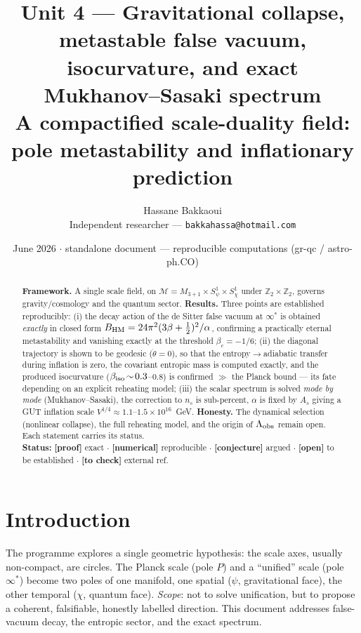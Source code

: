 \documentclass[11pt,a4paper]{article}
\title{\vspace{-1.2cm}\textbf{Unit 4 --- Gravitational collapse, metastable false vacuum,\\ isocurvature, and exact Mukhanov--Sasaki spectrum}\\[4pt]
\large A compactified scale-duality field: pole metastability and inflationary prediction}
\author{Hassane Bakkaoui\\ \small Independent researcher --- \texttt{bakkahassa@hotmail.com}}
\date{\small June 2026 $\cdot$ standalone document --- reproducible computations (gr-qc / astro-ph.CO)}
\newcommand{\st}[1]{\textbf{\textcolor{blue!45!black}{[#1]}}}
\newcommand{\fpole}{\infty^*}
\begin{document}
\maketitle
\thispagestyle{fancy}

\begin{abstract}
\noindent\textbf{Framework.} A single scale field, on $\mathcal{M}=M_{3+1}\times S^1_\psi\times S^1_\chi$ under $\mathbb{Z}_2\times\mathbb{Z}_2$, governs gravity/cosmology and the quantum sector. \textbf{Results.} Three points are established reproducibly: (i) the decay action of the de Sitter false vacuum at $\fpole$ is obtained \emph{exactly} in closed form $B_{\rm HM}=24\pi^2(3\beta+\tfrac12)^2/\alpha$, confirming a practically eternal metastability and vanishing exactly at the threshold $\beta_c=-1/6$; (ii) the diagonal trajectory is shown to be geodesic ($\dot\theta=0$), so that the entropy$\to$adiabatic transfer during inflation is zero, the covariant entropic mass is computed exactly, and the produced isocurvature ($\beta_{\rm iso}\!\sim\!0.3$--$0.8$) is confirmed $\gg$ the Planck bound --- its fate depending on an explicit reheating model; (iii) the scalar spectrum is solved \emph{mode by mode} (Mukhanov--Sasaki), the correction to $n_s$ is sub-percent, $\alpha$ is fixed by $A_s$ giving a GUT inflation scale $V^{1/4}\!\approx\!1.1$--$1.5\times10^{16}$~GeV. \textbf{Honesty.} The dynamical selection (nonlinear collapse), the full reheating model, and the origin of $\Lambda_{\rm obs}$ remain open. Each statement carries its status.\\
\textbf{Status:} \st{proof} exact $\cdot$ \st{numerical} reproducible $\cdot$ \st{conjecture} argued $\cdot$ \st{open} to be established $\cdot$ \st{to check} external ref.
\end{abstract}

\section{Introduction}
The programme explores a single geometric hypothesis: the scale axes, usually non-compact, are circles. The Planck scale (pole $P$) and a ``unified'' scale (pole $\fpole$) become two poles of one manifold, one spatial ($\psi$, gravitational face), the other temporal ($\chi$, quantum face). \emph{Scope}: not to solve unification, but to propose a coherent, falsifiable, honestly labelled direction. This document addresses false-vacuum decay, the entropic sector, and the exact spectrum.
\end{document}
